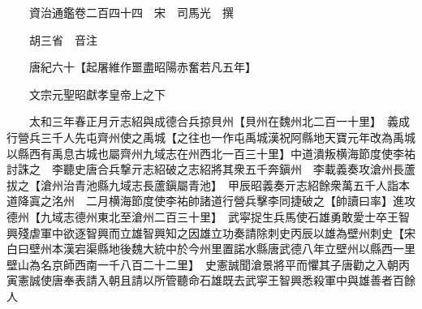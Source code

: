 










 


 
 


 

  
  
  
  
  





  
  
  
  
  
 
  

  

  
  
  



  

 
 

  
   




  

  
  


  　　資治通鑑卷二百四十四　宋　司馬光　撰

　　胡三省　音注

　　唐紀六十【起屠維作噩盡昭陽赤奮若凡五年】

　　文宗元聖昭獻孝皇帝上之下

　　太和三年春正月亓志紹與成德合兵掠貝州【貝州在魏州北二百一十里】　義成行營兵三千人先屯齊州使之禹城【之往也一作屯禹城漢祝阿縣地天寶元年改為禹城以縣西有禹息古城也屬齊州九域志在州西北一百三十里】中道潰叛横海節度使李祐討誅之　李聽史唐合兵撃亓志紹破之志紹將其衆五千奔鎭州　李載義奏攻滄州長蘆拔之【滄州治青池縣九域志長蘆鎭屬青池】　甲辰昭義奏亓志紹餘衆萬五千人詣本道降寘之洺州　二月横海節度使李祐帥諸道行營兵擊李同捷破之【帥讀曰率】進攻德州【九域志德州東北至滄州二百三十里】　武寜捉生兵馬使石雄勇敢愛士卒王智興殘虐軍中欲逐智興而立雄智興知之因雄立功奏請除刺史丙辰以雄為壁州刺史【宋白曰壁州本漢宕渠縣地後魏大統中於今州里置諾水縣唐武德八年立壁州以縣西一里壁山為名京師西南一千八百二十二里】　史憲誠聞滄景將平而懼其子唐勸之入朝丙寅憲誠使唐奉表請入朝且請以所管聽命石雄既去武寜王智興悉殺軍中與雄善者百餘人


